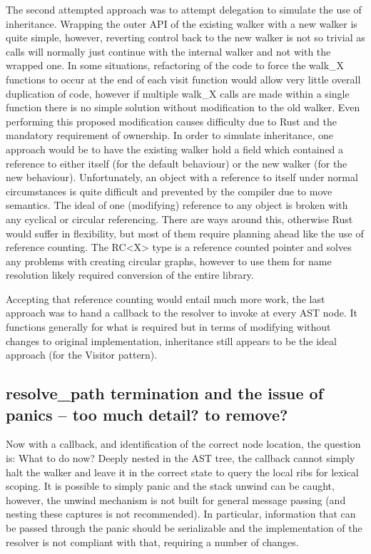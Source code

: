 The second attempted approach was to attempt delegation to simulate the use of inheritance. Wrapping the outer API of the existing walker with a new walker is quite simple, however, reverting control back to the new walker is not so trivial as calls will normally just continue with the internal walker and not with the wrapped one. In some situations, refactoring of the code to force the walk\_X functions to occur at the end of each visit function would allow very little overall duplication of code, however if multiple walk\_X calls are made within a single function there is no simple solution without modification to the old walker. Even performing this proposed modification causes difficulty due to Rust and the mandatory requirement of ownership. In order to simulate inheritance, one approach would be to have the existing walker hold a field which contained a reference to either itself (for the default behaviour) or the new walker (for the new behaviour). Unfortunately, an object with a reference to itself under normal circumstances is quite difficult and prevented by the compiler due to move semantics. The ideal of one (modifying) reference to any object is broken with any cyclical or circular referencing. There are ways around this, otherwise Rust would suffer in flexibility, but most of them require planning ahead like the use of reference counting. The RC\textless{}X\textgreater{} type is a reference counted pointer and solves any problems with creating circular graphs, however to use them for name resolution likely required conversion of the entire library.

Accepting that reference counting would entail much more work, the last approach was to hand a callback to the resolver to invoke at every AST node. It functions generally for what is required but in terms of modifying without changes to original implementation, inheritance still appears to be the ideal approach (for the Visitor pattern).

\subsection{resolve\_path termination and the issue of panics -- too much detail? to remove?}
Now with a callback, and identification of the correct node location, the question is: What to do now? Deeply nested in the AST tree, the callback cannot simply halt the walker and leave it in the correct state to query the local ribs for lexical scoping. It is possible to simply panic and the stack unwind can be caught, however, the unwind mechanism is not built for general message passing (and nesting these captures is not recommended). In particular, information that can be passed through the panic should be serializable and the implementation of the resolver is not compliant with that, requiring a number of changes.

